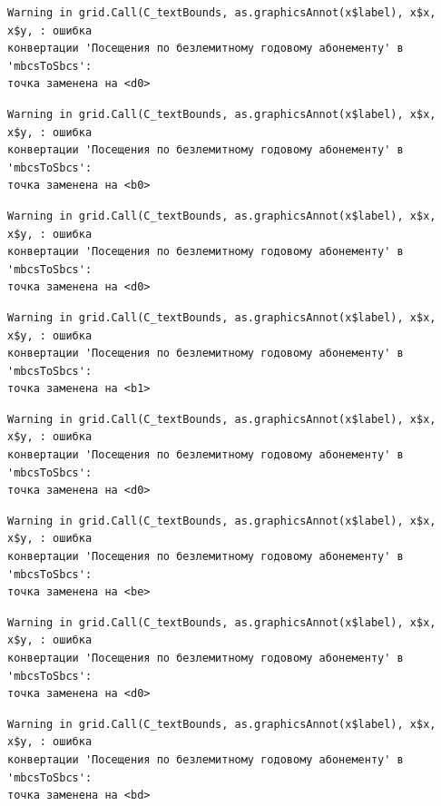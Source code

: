 \documentclass[
  letterpaper,
  DIV=11,
  numbers=noendperiod]{scrreprt}
\begin{document}
\begin{verbatim}
Warning in grid.Call(C_textBounds, as.graphicsAnnot(x$label), x$x, x$y, : ошибка
конвертации 'Посещения по безлемитному годовому абонементу' в 'mbcsToSbcs':
точка заменена на <d0>
\end{verbatim}

\begin{verbatim}
Warning in grid.Call(C_textBounds, as.graphicsAnnot(x$label), x$x, x$y, : ошибка
конвертации 'Посещения по безлемитному годовому абонементу' в 'mbcsToSbcs':
точка заменена на <b0>
\end{verbatim}

\begin{verbatim}
Warning in grid.Call(C_textBounds, as.graphicsAnnot(x$label), x$x, x$y, : ошибка
конвертации 'Посещения по безлемитному годовому абонементу' в 'mbcsToSbcs':
точка заменена на <d0>
\end{verbatim}

\begin{verbatim}
Warning in grid.Call(C_textBounds, as.graphicsAnnot(x$label), x$x, x$y, : ошибка
конвертации 'Посещения по безлемитному годовому абонементу' в 'mbcsToSbcs':
точка заменена на <b1>
\end{verbatim}

\begin{verbatim}
Warning in grid.Call(C_textBounds, as.graphicsAnnot(x$label), x$x, x$y, : ошибка
конвертации 'Посещения по безлемитному годовому абонементу' в 'mbcsToSbcs':
точка заменена на <d0>
\end{verbatim}

\begin{verbatim}
Warning in grid.Call(C_textBounds, as.graphicsAnnot(x$label), x$x, x$y, : ошибка
конвертации 'Посещения по безлемитному годовому абонементу' в 'mbcsToSbcs':
точка заменена на <be>
\end{verbatim}

\begin{verbatim}
Warning in grid.Call(C_textBounds, as.graphicsAnnot(x$label), x$x, x$y, : ошибка
конвертации 'Посещения по безлемитному годовому абонементу' в 'mbcsToSbcs':
точка заменена на <d0>
\end{verbatim}

\begin{verbatim}
Warning in grid.Call(C_textBounds, as.graphicsAnnot(x$label), x$x, x$y, : ошибка
конвертации 'Посещения по безлемитному годовому абонементу' в 'mbcsToSbcs':
точка заменена на <bd>
\end{verbatim}
\end{document}
